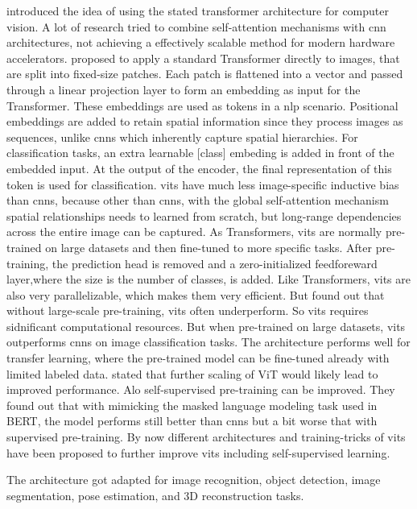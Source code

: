 \documentclass[conference]{IEEEtran}
\begin{document}
\citeauthor{visiontransformers2021} introduced the idea of using the stated transformer architecture for computer vision. A lot of research tried to combine self-attention mechanisms with \ac{cnn} architectures, not achieving a effectively scalable method for modern hardware accelerators. \cite{visiontransformers2021} proposed to apply a standard Transformer directly to images, that are split into fixed-size patches. Each patch is flattened into a vector and passed through a linear projection layer to form an embedding as input for the Transformer. These embeddings are used as tokens in a \ac{nlp} scenario. Positional embeddings are added to retain spatial information since they process images as sequences, unlike \acp{cnn} which inherently capture spatial hierarchies. For classification tasks, an extra learnable [class] embeding is added in front of the embedded input. At the output of the encoder, the final representation of this token is used for classification. \acp{vit} have much less image-specific inductive bias than \acp{cnn}, because other than \acp{cnn}, with the global self-attention mechanism spatial relationships needs to learned from scratch, but long-range dependencies across the entire image can be captured. As Transformers, \acp{vit} are normally pre-trained on large datasets and then fine-tuned to more specific tasks. After pre-training, the prediction head is removed and a zero-initialized feedforeward layer,where the size is the number of classes, is added.
Like Transformers, \acp{vit} are also very parallelizable, which makes them very efficient. But \cite{visiontransformers2021} found out that without large-scale pre-training, \acp{vit} often underperform. So \acp{vit} requires sidnificant computational resources. But when pre-trained on large datasets, \acp{vit} outperforms \acp{cnn} on image classification tasks. The architecture performs well for transfer learning, where the pre-trained model can be fine-tuned already with limited labeled data. \cite{visiontransformers2021} \cite{visiontransformers2021} stated that further scaling of ViT would likely lead to improved performance.  Alo  self-supervised pre-training can be improved. They found out that with mimicking the masked language modeling task used in BERT, the model performs still better than \acp{cnn} but a bit worse that with supervised pre-training. By now different architectures and training-tricks of \acp{vit} have been proposed to further improve \acp{vit} including self-supervised learning.

The architecture got adapted for image recognition, object detection, image segmentation, pose estimation, and 3D reconstruction tasks. \cite{vit-state-challenges} 
\end{document}
